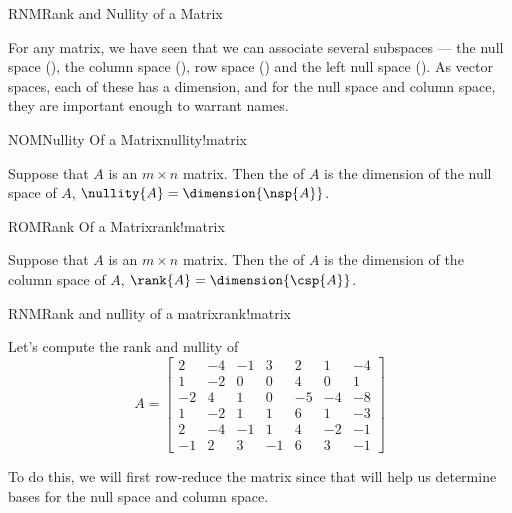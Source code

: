 \begin{subsect}{RNM}{Rank and Nullity of a Matrix}
%
\begin{para}For any matrix, we have seen that we can associate several subspaces --- the null space (), the column space (), row space () and the left null space  ().  As vector spaces, each of these has a dimension, and for the null space and column space, they are important enough to warrant names.\end{para}
%
\begin{definition}{NOM}{Nullity Of a Matrix}{nullity!matrix}
\begin{para}Suppose that $A$ is an $m\times n$ matrix.  Then the  of $A$ is the dimension of the null space of $A$, $\nullity{A}=\dimension{\nsp{A}}$.\end{para}
\end{definition}
%
\begin{definition}{ROM}{Rank Of a Matrix}{rank!matrix}
\begin{para}Suppose that $A$ is an $m\times n$ matrix.  Then the  of $A$ is the dimension of the column space of $A$, $\rank{A}=\dimension{\csp{A}}$.\end{para}
\end{definition}
%
\begin{example}{RNM}{Rank and nullity of a matrix}{rank!matrix}
\begin{para}Let's compute the rank and nullity of
%
\begin{equation*}
A=\begin{bmatrix}
2 & -4 & -1 & 3 & 2 & 1 & -4\\
1 & -2 & 0 & 0 & 4 & 0 & 1\\
-2 & 4 & 1 & 0 & -5 & -4 & -8\\
1 & -2 & 1 & 1 & 6 & 1 & -3\\
2 & -4 & -1 & 1 & 4 & -2 & -1\\
-1 & 2 & 3 & -1 & 6 & 3 & -1
\end{bmatrix}
\end{equation*}
\end{para}
%
\begin{para}To do this, we will first row-reduce the matrix since that will help us determine bases for the null space and column space.
%
\begin{equation*}

\end{equation*}
\end{para}
\end{example}
\end{subsect}
